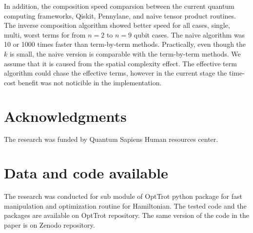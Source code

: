 \documentclass[twocolumn]{article}
\begin{document}
In addition, the composition speed comparsion between the current quantum computing frameworks, Qiskit, Pennylane, and naive
tensor product routines. 
The inverse composition algorithm showed better speed for all cases, single, multi, worst terms 
for from $n=2$ to $n=9$ qubit cases. 
The naive algorithm was 10 or 1000 times faster than term-by-term methods.
Practically, even though the $k$ is small, the naive version is comparable 
with the term-by-term methods. 
We assume that it is caused from the spatial complexity effect.
The effective term algorithm could chase the effective terms, however in the current stage the time-cost benefit 
was not noticible in the implementation.

\section*{Acknowledgments}
The research was funded by Quantum Sapiens Human resources center.

\section*{Data and code available}
The research was conducted for sub module of OptTrot python package for 
fast manipulation and optimization routine for Hamiltonian.
The tested code and the packages are available on OptTrot repository.
The same version of the code in the paper is on 
Zenodo repository\cite{kim_2024_11048922}.
  
  

\appendix
%
%
%
%
%
\end{document}
